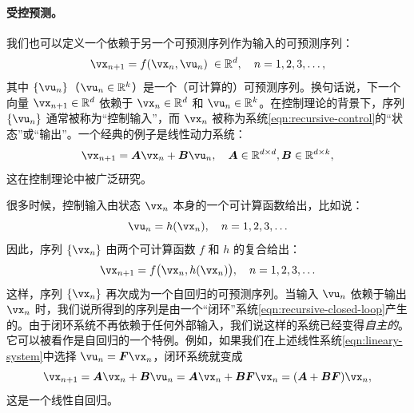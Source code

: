 \documentclass[../../book-main.tex]{subfiles}
\begin{document}
\paragraph{受控预测。}
我们也可以定义一个依赖于另一个可预测序列作为输入的可预测序列：
\begin{equation}
    \vx_{n+1} = f(\vx_{n}, \vu_n) \; \in \mathbb{R}^d, \quad n =  1, 2, 3, \ldots,
\label{eqn:recursive-control}
\end{equation}
其中 $\{\vu_n\}$（$\vu_n \in \mathbb{R}^k$）是一个（可计算的）可预测序列。换句话说，下一个向量 $\vx_{n+1} \in \mathbb{R}^d$ 依赖于 $\vx_n \in \mathbb{R}^d$ 和 $\vu_n \in \mathbb{R}^k$。在控制理论的背景下，序列 $\{\vu_n\}$ 通常被称为“控制输入”，而 $\vx_n$ 被称为系统\eqref{eqn:recursive-control}的“状态”或“输出”。一个经典的例子是线性动力系统：
\begin{equation}
    \vx_{n+1} = \boldsymbol{A}\vx_n + \boldsymbol{B}\vu_n, \quad \boldsymbol{A} \in \mathbb{R}^{d\times d}, \boldsymbol{B} \in \mathbb{R}^{d\times k},
    \label{eqn:lineary-system} 
\end{equation}
这在控制理论中被广泛研究\cite{Cal:Des}。

很多时候，控制输入由状态 $\vx_n$ 本身的一个可计算函数给出，比如说：
\begin{equation}
    \vu_n = h(\vx_n), \quad n =  1, 2, 3, \ldots 
\end{equation}
因此，序列 $\{\vx_n\}$ 由两个可计算函数 $f$ 和 $h$ 的复合给出：
\begin{equation}
    \vx_{n+1} = f\big(\vx_{n}, h(\vx_n)\big), \quad n =  1, 2, 3, \ldots
    \label{eqn:recursive-closed-loop}
\end{equation}
这样，序列 $\{\vx_n\}$ 再次成为一个自回归的可预测序列。当输入 $\vu_n$ 依赖于输出 $\vx_n$ 时，我们说所得到的序列是由一个“闭环”系统\eqref{eqn:recursive-closed-loop}产生的。由于闭环系统不再依赖于任何外部输入，我们说这样的系统已经变得{\em 自主的}。它可以被看作是自回归的一个特例。例如，如果我们在上述线性系统\eqref{eqn:lineary-system}中选择 $\vu_n = \boldsymbol{F}\vx_n$，闭环系统就变成
\begin{equation}
        \vx_{n+1} = \boldsymbol{A}\vx_n + \boldsymbol{B}\vu_n = \boldsymbol{A}\vx_n + \boldsymbol{B}\boldsymbol{F}\vx_n = (\boldsymbol{A}+ \boldsymbol{B}\boldsymbol{F})\vx_n,
    \label{eqn:lineary-system-closed}
\end{equation}
这是一个线性自回归。

\end{document}
